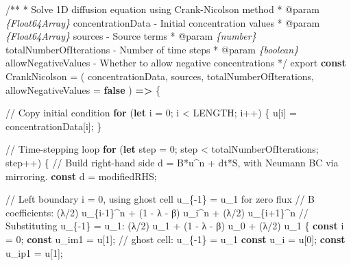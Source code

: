 \documentclass[
  letterpaper,
  DIV=11,
  numbers=noendperiod]{scrreprt}
\newenvironment{Shaded}{\begin{snugshade}}{\end{snugshade}}
\newcommand{\AnnotationTok}[1]{\textcolor[rgb]{0.37,0.37,0.37}{#1}}
\newcommand{\CommentTok}[1]{\textcolor[rgb]{0.37,0.37,0.37}{#1}}
\newcommand{\CommentVarTok}[1]{\textcolor[rgb]{0.37,0.37,0.37}{\textit{#1}}}
\newcommand{\ControlFlowTok}[1]{\textcolor[rgb]{0.00,0.23,0.31}{\textbf{#1}}}
\newcommand{\DecValTok}[1]{\textcolor[rgb]{0.68,0.00,0.00}{#1}}
\newcommand{\ImportTok}[1]{\textcolor[rgb]{0.00,0.46,0.62}{#1}}
\newcommand{\KeywordTok}[1]{\textcolor[rgb]{0.00,0.23,0.31}{\textbf{#1}}}
\newcommand{\NormalTok}[1]{\textcolor[rgb]{0.00,0.23,0.31}{#1}}
\newcommand{\OperatorTok}[1]{\textcolor[rgb]{0.37,0.37,0.37}{#1}}
\begin{document}
\label{cn-main-function}%
\begin{Shaded}
\begin{Highlighting}[]
\CommentTok{/**}
\CommentTok{ * Solve 1D diffusion equation using Crank{-}Nicolson method}
\CommentTok{ * }\AnnotationTok{@param}\CommentTok{ }\CommentVarTok{\{Float64Array\}}\CommentTok{ concentrationData {-} Initial concentration values}
\CommentTok{ * }\AnnotationTok{@param}\CommentTok{ }\CommentVarTok{\{Float64Array\}}\CommentTok{ sources {-} Source terms}
\CommentTok{ * }\AnnotationTok{@param}\CommentTok{ }\CommentVarTok{\{number\}}\CommentTok{ totalNumberOfIterations {-} Number of time steps}
\CommentTok{ * }\AnnotationTok{@param}\CommentTok{ }\CommentVarTok{\{boolean\}}\CommentTok{ allowNegativeValues {-} Whether to allow negative concentrations}
\CommentTok{ */}
\ImportTok{export} \KeywordTok{const}\NormalTok{ CrankNicolson }\OperatorTok{=}\NormalTok{ (}
\NormalTok{    concentrationData}\OperatorTok{,}
\NormalTok{    sources}\OperatorTok{,}
\NormalTok{    totalNumberOfIterations}\OperatorTok{,}
\NormalTok{    allowNegativeValues }\OperatorTok{=} \KeywordTok{false}
\NormalTok{) }\KeywordTok{=\textgreater{}}\NormalTok{ \{}
  

    \CommentTok{// Copy initial condition}
    \ControlFlowTok{for}\NormalTok{ (}\KeywordTok{let}\NormalTok{ i }\OperatorTok{=} \DecValTok{0}\OperatorTok{;}\NormalTok{ i }\OperatorTok{\textless{}}\NormalTok{ LENGTH}\OperatorTok{;}\NormalTok{ i}\OperatorTok{++}\NormalTok{) \{}
\NormalTok{        u[i] }\OperatorTok{=}\NormalTok{ concentrationData[i]}\OperatorTok{;}
\NormalTok{    \}}

    \CommentTok{// Time{-}stepping loop}
    \ControlFlowTok{for}\NormalTok{ (}\KeywordTok{let}\NormalTok{ step }\OperatorTok{=} \DecValTok{0}\OperatorTok{;}\NormalTok{ step }\OperatorTok{\textless{}}\NormalTok{ totalNumberOfIterations}\OperatorTok{;}\NormalTok{ step}\OperatorTok{++}\NormalTok{) \{}
        \CommentTok{// Build right{-}hand side d = B*u\^{}n + dt*S, with Neumann BC via mirroring.}
        \KeywordTok{const}\NormalTok{ d }\OperatorTok{=}\NormalTok{ modifiedRHS}\OperatorTok{;}

        \CommentTok{// Left boundary i = 0, using ghost cell u\_\{{-}1\} = u\_1 for zero flux}
        \CommentTok{// B coefficients: (λ/2) u\_\{i{-}1\}\^{}n + (1 {-} λ {-} β) u\_i\^{}n + (λ/2) u\_\{i+1\}\^{}n}
        \CommentTok{// Substituting u\_\{{-}1\} = u\_1: (λ/2) u\_1 + (1 {-} λ {-} β) u\_0 + (λ/2) u\_1}
\NormalTok{        \{}
            \KeywordTok{const}\NormalTok{ i }\OperatorTok{=} \DecValTok{0}\OperatorTok{;}
            \KeywordTok{const}\NormalTok{ u\_im1 }\OperatorTok{=}\NormalTok{ u[}\DecValTok{1}\NormalTok{]}\OperatorTok{;}       \CommentTok{// ghost cell: u\_\{{-}1\} = u\_1}
            \KeywordTok{const}\NormalTok{ u\_i   }\OperatorTok{=}\NormalTok{ u[}\DecValTok{0}\NormalTok{]}\OperatorTok{;}
            \KeywordTok{const}\NormalTok{ u\_ip1 }\OperatorTok{=}\NormalTok{ u[}\DecValTok{1}\NormalTok{]}\OperatorTok{;}


\end{Highlighting}
\end{Shaded}
\end{document}
